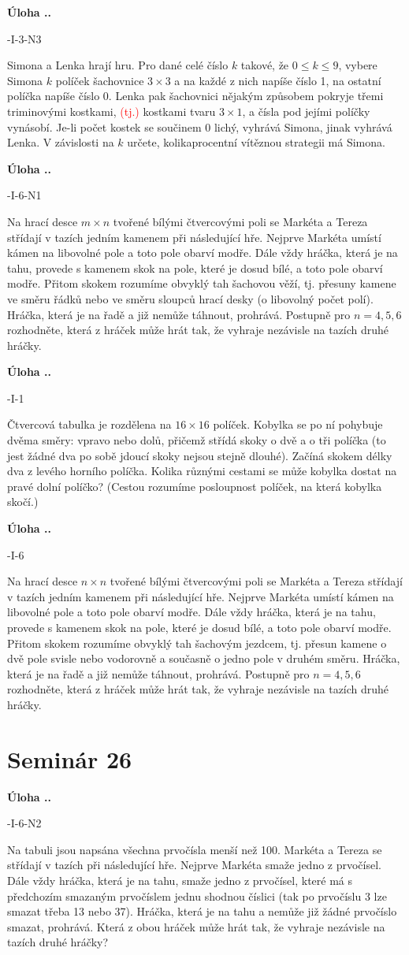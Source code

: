 \documentclass{article}
\newcounter{seminar}
\newcounter{problem}
\newcommand{\seminar}[1]{
  \clearpage
  \setcounter{seminar}{#1}
  \setcounter{problem}{0}
  \section*{Seminár #1}
}
\newcommand\todo[1]{\noindent\textcolor{red}{(#1)}}
\newcommand{\source}[1]{
  \def\temp{#1}\ifx\temp\empty
  \else
    [#1]
  \fi
}
\newcommand{\problem}[3]{
  \stepcounter{problem}
  \noindent\textbf{Úloha \theseminar .\theproblem.}
    \source{#1} #2
  \bigskip
}
\begin{document}
\problem{64-I-3-N3}{
Simona a Lenka hrají hru. Pro dané celé číslo $k$ takové, že $0 \leq k \leq 9$, vybere Simona $k$ políček šachovnice $3 \times 3$ a na každé z nich napíše číslo 1, na ostatní políčka napíše číslo 0. Lenka pak šachovnici nějakým způsobem pokryje třemi triminovými kostkami, \todo{tj.} kostkami tvaru $3 \times 1$, a čísla pod jejími políčky vynásobí. Je-li počet kostek se součinem 0 lichý, vyhrává Simona, jinak vyhrává Lenka. V závislosti na $k$ určete, kolikaprocentní vítěznou strategii má Simona.
}{
}

\problem{61-I-6-N1}{
Na hrací desce $m \times n$ tvořené bílými čtvercovými poli se Markéta a Tereza střídají v tazích jedním kamenem při následující hře. Nejprve Markéta umístí kámen na libovolné pole a toto pole obarví modře. Dále vždy hráčka, která je na tahu, provede s kamenem skok na pole, které je dosud bílé, a toto pole obarví modře. Přitom skokem rozumíme obvyklý tah šachovou věží, tj. přesuny kamene ve směru řádků nebo ve směru sloupců hrací desky (o libovolný počet polí). Hráčka, která je na řadě a již nemůže táhnout, prohrává. Postupně pro $n = 4, 5, 6$ rozhodněte, která z hráček může hrát tak, že vyhraje nezávisle na tazích druhé hráčky.
}{
}

\problem{62-I-1}{
Čtvercová tabulka je rozdělena na $16 \times 16$ políček. Kobylka se po ní pohybuje dvěma směry: vpravo nebo dolů, přičemž střídá skoky o dvě a o tři políčka (to jest žádné dva po sobě jdoucí skoky nejsou stejně dlouhé). Začíná skokem délky dva z levého horního políčka. Kolika různými cestami se může kobylka dostat na pravé dolní políčko? (Cestou rozumíme posloupnost políček, na která kobylka skočí.)
}{
}

\problem{61-I-6}{
Na hrací desce $n \times n$ tvořené bílými čtvercovými poli se Markéta a Tereza střídají v tazích jedním kamenem při následující hře. Nejprve Markéta umístí kámen na libovolné pole a toto pole obarví modře. Dále vždy hráčka, která je na tahu, provede s kamenem skok na pole, které je dosud bílé, a toto pole obarví modře. Přitom skokem rozumíme obvyklý tah šachovým jezdcem, tj. přesun kamene o dvě pole svisle nebo vodorovně a současně o jedno pole v druhém směru. Hráčka, která je na řadě a již nemůže táhnout, prohrává. Postupně pro $n = 4, 5, 6$ rozhodněte, která z hráček může hrát tak, že vyhraje nezávisle na tazích druhé hráčky.
}{
}


\seminar{26}

\problem{61-I-6-N2}{
Na tabuli jsou napsána všechna prvočísla menší než 100. Markéta a Tereza se střídají v tazích při následující hře. Nejprve Markéta smaže jedno z prvočísel. Dále vždy hráčka, která je na tahu, smaže jedno z prvočísel, které má s předchozím smazaným prvočíslem jednu shodnou číslici (tak po prvočíslu 3 lze smazat třeba 13 nebo 37). Hráčka, která je na tahu a nemůže již žádné prvočíslo smazat, prohrává. Která z obou hráček může hrát
tak, že vyhraje nezávisle na tazích druhé hráčky?
}{
}
\end{document}
